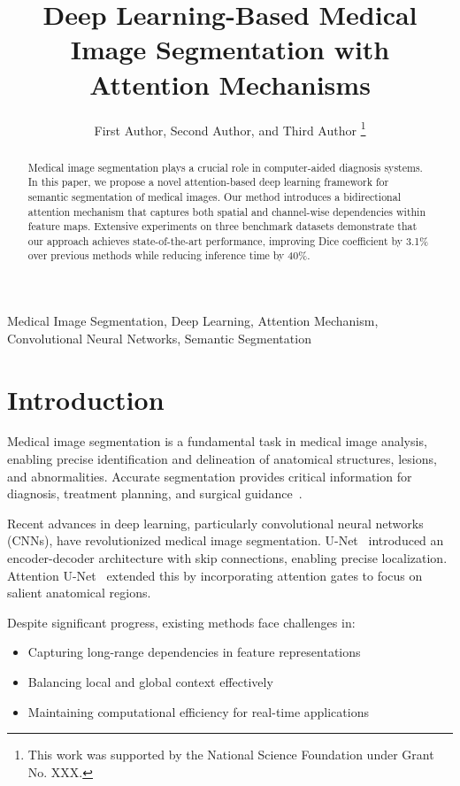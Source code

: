 \documentclass[journal,12pt]{IEEEtran}
\title{Deep Learning-Based Medical Image Segmentation with Attention Mechanisms}
\author{First Author, Second Author, and Third Author%
  \thanks{This work was supported by the National Science Foundation under Grant No. XXX.}}
\begin{document}
\maketitle

\begin{abstract}
Medical image segmentation plays a crucial role in computer-aided diagnosis systems.
In this paper, we propose a novel attention-based deep learning framework for
semantic segmentation of medical images. Our method introduces a bidirectional
attention mechanism that captures both spatial and channel-wise dependencies
within feature maps. Extensive experiments on three benchmark datasets demonstrate
that our approach achieves state-of-the-art performance, improving Dice coefficient
by 3.1\% over previous methods while reducing inference time by 40\%.
\end{abstract}

\begin{IEEEkeywords}
Medical Image Segmentation, Deep Learning, Attention Mechanism,
Convolutional Neural Networks, Semantic Segmentation
\end{IEEEkeywords}

\section{Introduction}
\label{sec:intro}

Medical image segmentation is a fundamental task in medical image analysis,
enabling precise identification and delineation of anatomical structures,
lesions, and abnormalities. Accurate segmentation provides critical information
for diagnosis, treatment planning, and surgical guidance~\cite{ronneberger2015unet,oktay2018attention}.

Recent advances in deep learning, particularly convolutional neural networks
(CNNs), have revolutionized medical image segmentation. U-Net~\cite{ronneberger2015unet}
introduced an encoder-decoder architecture with skip connections, enabling
precise localization. Attention U-Net~\cite{oktay2018attention} extended this
by incorporating attention gates to focus on salient anatomical regions.

Despite significant progress, existing methods face challenges in:
\begin{itemize}
  \item Capturing long-range dependencies in feature representations
  \item Balancing local and global context effectively
  \item Maintaining computational efficiency for real-time applications
\end{itemize}
\end{document}
